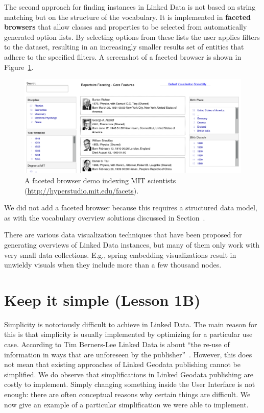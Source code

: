 \documentclass[a4paper]{scrartcl}
\begin{document}
The second approach for finding instances in Linked Data is not based
on string matching but on the structure of the vocabulary.  It is
implemented in \textbf{faceted browsers} that allow classes and
properties to be selected from automatically generated option lists.
By selecting options from these lists the user applies filters to the
dataset, resulting in an increasingly smaller results set of entities
that adhere to the specified filters.  A screenshot of a faceted
browser is shown in Figure~\ref{fig:faceted_browser}.

\begin{figure}
  \includegraphics[width=\linewidth]{img/faceted_browser}
  \caption{A faceted browser demo indexing MIT scientists
    (\url{http://hyperstudio.mit.edu/facets}).}
  \label{fig:faceted_browser}
\end{figure}

We did not add a faceted browser because this requires a structured
data model, as with the vocabulary overview solutions discussed in
Section~\label{sec:vocabulary_overview}.

There are various data visualization techniques that have been
proposed for generating overviews of Linked Data instances, but many
of them only work with very small data collections.  E.g., spring
embedding visualizations result in unwieldy visuals when they include
more than a few thousand nodes.



\section{Keep it simple (Lesson 1B)}

Simplicity is notoriously difficult to achieve in Linked Data.  The
main reason for this is that simplicity is usually implemented by
optimizing for a particular use case.  According to Tim Berners-Lee
Linked Data is about ``the re-use of information in ways that are
unforeseen by the publisher''~\cite{Bernerslee2006}.  However, this
does not mean that existing approaches of Linked Geodata publishing
cannot be simplified.  We do observe that simplifications in Linked
Geodata publishing are costly to implement.  Simply changing something
inside the User Interface is not enough: there are often conceptual
reasons why certain things are difficult.  We now give an example of a
particular simplification we were able to implement.
\end{document}
